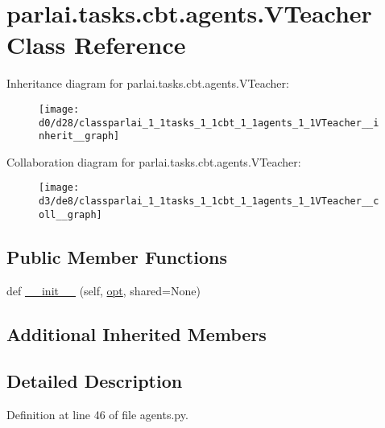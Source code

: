 \hypertarget{classparlai_1_1tasks_1_1cbt_1_1agents_1_1VTeacher}{}\section{parlai.\+tasks.\+cbt.\+agents.\+V\+Teacher Class Reference}
\label{classparlai_1_1tasks_1_1cbt_1_1agents_1_1VTeacher}


Inheritance diagram for parlai.\+tasks.\+cbt.\+agents.\+V\+Teacher\+:
\nopagebreak
\begin{figure}[H]
\begin{center}
\leavevmode
\texttt{[image: d0/d28/classparlai\_1\_1tasks\_1\_1cbt\_1\_1agents\_1\_1VTeacher\_\_inherit\_\_graph]}
\end{center}
\end{figure}


Collaboration diagram for parlai.\+tasks.\+cbt.\+agents.\+V\+Teacher\+:
\nopagebreak
\begin{figure}[H]
\begin{center}
\leavevmode
\texttt{[image: d3/de8/classparlai\_1\_1tasks\_1\_1cbt\_1\_1agents\_1\_1VTeacher\_\_coll\_\_graph]}
\end{center}
\end{figure}
\subsection*{Public Member Functions}
\begin{DoxyCompactItemize}
\item 
def \hyperlink{classparlai_1_1tasks_1_1cbt_1_1agents_1_1VTeacher_a19797ded538cc0a6d4cd544c4e2b6b1b}{\+\_\+\+\_\+init\+\_\+\+\_\+} (self, \hyperlink{classparlai_1_1core_1_1teachers_1_1FbDialogTeacher_af7a9ec497b9cd0292d7b8fa220da7c28}{opt}, shared=None)
\end{DoxyCompactItemize}
\subsection*{Additional Inherited Members}


\subsection{Detailed Description}


Definition at line 46 of file agents.\+py.



